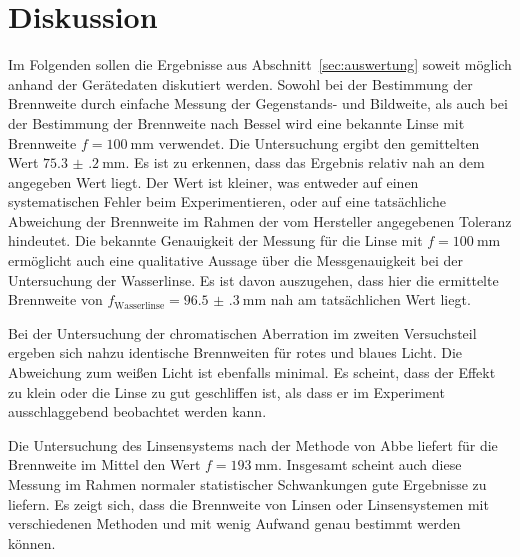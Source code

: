\documentclass[
  parskip=half,
  bibliography=totoc,     %
  captions=tableheading,  %
  titlepage=firstiscover, %
]{scrartcl}
\begin{document}
\section{Diskussion}
\label{sec:diskussion}
Im Folgenden sollen die Ergebnisse aus Abschnitt~\ref{sec:auswertung} soweit möglich anhand der Gerätedaten
diskutiert werden. Sowohl bei der Bestimmung der Brennweite durch einfache Messung der Gegenstands- und
Bildweite, als auch bei der Bestimmung der Brennweite nach Bessel wird eine bekannte Linse mit
Brennweite $f=\SI{100}{\milli\metre}$ verwendet. Die Untersuchung ergibt den gemittelten Wert
$\SI{75.3(2)}{\milli\metre}$. Es ist zu erkennen, dass das
Ergebnis relativ nah an dem angegeben Wert liegt. Der Wert ist kleiner, was entweder auf einen
systematischen Fehler beim Experimentieren, oder auf eine tatsächliche Abweichung der Brennweite im Rahmen
der vom Hersteller angegebenen Toleranz hindeutet. Die bekannte Genauigkeit der Messung für die Linse mit
$f=\SI{100}{\milli\metre}$ ermöglicht auch eine qualitative Aussage über die Messgenauigkeit bei der
Untersuchung der Wasserlinse. Es ist davon auszugehen, dass hier die ermittelte Brennweite von $f_{\text{Wasserlinse}} = \SI{96.5(3)}{\milli\metre}$
 nah am tatsächlichen Wert liegt.

Bei der Untersuchung der chromatischen Aberration im zweiten Versuchsteil ergeben sich nahzu identische
Brennweiten für rotes und blaues Licht. Die Abweichung zum weißen Licht ist ebenfalls minimal. Es scheint,
dass der Effekt zu klein oder die Linse zu gut geschliffen ist, als dass er im Experiment ausschlaggebend beobachtet werden
kann.

Die Untersuchung des Linsensystems nach der Methode von Abbe liefert für die Brennweite im Mittel
den Wert $f=\SI{193}{\milli\metre}$. Insgesamt scheint auch diese Messung im
Rahmen normaler statistischer Schwankungen gute Ergebnisse zu liefern. Es zeigt sich, dass die Brennweite
von Linsen oder Linsensystemen mit verschiedenen Methoden und mit wenig Aufwand genau bestimmt werden können.
\clearpage
\nocite{*}
\printbibliography
\end{document}
